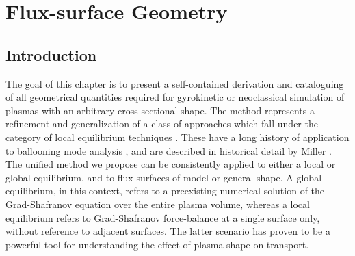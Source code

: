 \chapter{Flux-surface Geometry}\label{chap.geometry}

\section{Introduction}\label{sec.geointro}

The goal of this chapter is to present a self-contained derivation 
and cataloguing of all geometrical quantities required for gyrokinetic 
or neoclassical simulation of plasmas with an arbitrary cross-sectional 
shape.  The method represents a refinement and generalization of 
a class of approaches which fall under the category of local 
equilibrium techniques \cite{mercier:1974}. These have a long history 
of application to ballooning mode analysis 
\cite{greene:1981,bishop:1984,miller:1998}, 
and are described in historical detail by Miller \cite{miller:1998}.  
The unified method we propose can be consistently applied 
to either a local or global equilibrium, and to flux-surfaces 
of model or general shape.  A global equilibrium, in this context, 
refers to a preexisting numerical solution of the Grad-Shafranov 
equation over the entire plasma volume, whereas a local equilibrium 
refers to Grad-Shafranov force-balance at a single surface only,
without reference to adjacent surfaces.  The latter scenario has 
proven to be a powerful tool for understanding the effect 
of plasma shape \cite{kinsey:2007,belli:2008b} on transport.

